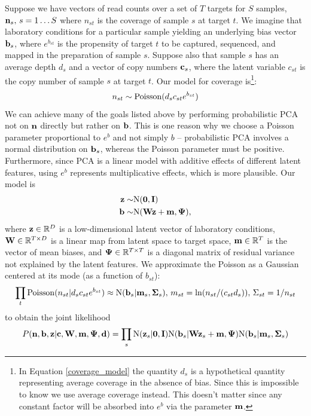 \documentclass[nofootinbib,amssymb,amsmath]{revtex4}
\newcommand{\vzero}{{\bf 0}}
\newcommand{\vI}{{\bf I}}
\newcommand{\vb}{{\bf b}}
\newcommand{\vd}{{\bf d}}
\newcommand{\vc}{{\bf c}}
\newcommand{\vz}{{\bf z}}
\newcommand{\vn}{{\bf n}}
\newcommand{\vm}{{\bf m}}
\newcommand{\vW}{{\bf W}}
\newcommand{\vPsi}{{\bf \Psi}}
\newcommand{\vSigma}{{\bf \Sigma}}
\begin{document}
Suppose we have vectors of read counts over a set of $T$ targets for $S$ samples, $\vn_s, \, s = 1 \ldots S$ where $n_{st}$ is the coverage of sample $s$ at target $t$.  We imagine that laboratory conditions for a particular sample yielding an underlying bias vector $\vb_s$, where $e^{b_{st}}$ is the propensity of target $t$ to be captured, sequenced, and mapped in the preparation of sample $s$.  Suppose also that sample $s$ has an average depth $d_s$ and a vector of copy numbers $\vc_s$, where the latent variable $c_{st}$ is the copy number of sample $s$ at target $t$.  Our model for coverage is\footnote{In Equation \ref{coverage_model} the quantity $d_s$ is a hypothetical quantity representing average coverage in the absence of bias.  Since this is impossible to know we use average coverage instead.  This doesn't matter since any constant factor will be absorbed into $e^b$ via the parameter $\vm$.}:
%
\begin{equation}
n_{st} \sim {\rm Poisson}(d_s c_{st} e^{b_{st}})
\label{coverage_model}
\end{equation}
%
We can achieve many of the goals listed above by performing probabilistic PCA not on $\vn$ directly but rather on $\vb$.  This is one reason why we choose a Poisson parameter proportional to $e^b$ and not simply $b$ -- probabilistic PCA involves a normal distribution on $\vb_s$, whereas the Poisson parameter must be positive.  Furthermore, since PCA is a linear model with additive effects of different latent features, using $e^b$ represents multiplicative effects, which is more plausible.  Our model is
%
\begin{align}
\vz \sim& {\rm N}(\vzero, \vI) \\
\vb \sim& {\rm N}(\vW \vz + \vm, \vPsi),
\end{align}
%
where $\vz \in \mathbb{R}^D$ is a low-dimensional latent vector of laboratory conditions, $\vW \in \mathbb{R}^{T \times D}$ is a linear map from latent space to target space, $\vm \in \mathbb{R}^T$ is the vector of mean biases, and $\vPsi \in \mathbb{R}^{T \times T}$ is a diagonal matrix of residual variance not explained by the latent features.  We approximate the Poisson as a Gaussian centered at its mode (as a function of $b_{st}$):
%
\begin{align}
\prod_t {\rm Poisson}(n_{st} | d_s c_{st} e^{b_{st}}) \approx {\rm N}(\vb_s | \vm_s, \vSigma_s), \, m_{st} = \ln(n_{st}/(c_{st} d_s)), \, \Sigma_{st} = 1/n_{st}
\end{align}
%
to obtain the joint likelihood
%
\begin{equation}
P(\vn, \vb, \vz | \vc, \vW, \vm, \vPsi, \vd ) = \prod_s {\rm N}(\vz_s | \vzero, \vI) {\rm N}(\vb_s | \vW \vz_s + \vm, \vPsi) {\rm N}(\vb_s | \vm_s, \vSigma_s)
\end{equation}
%
\end{document}
